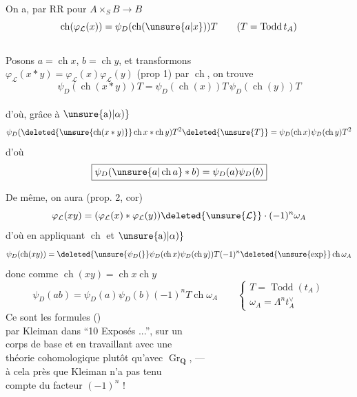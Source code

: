  On a, par RR pour $A\times_S B\longrightarrow B$
\[
\operatorname{ch}(\varphi_{\mathcal L}(x))=\psi_D(\operatorname{ch}(\unsure{a|x}))T
\qquad(T=\operatorname{Todd}t_A)
\]
\\
Posons $a=\operatorname{ch}x$, $b=\operatorname{ch}y$, et transformons\\
$\varphi_{\mathcal L}(x*y)=\varphi_{\mathcal L}(x)\varphi_{\mathcal L}(y)$ (prop 1) par $\operatorname{ch}$, on trouve
\[
\psi_D(\operatorname{ch}(x*y))T=\psi_D(\operatorname{ch}(x))T\,\psi_D(\operatorname{ch}(y))T
\]
\\
d'où, \deleted{$\unsure{\varphi}$} grâce à $\unsure{\text{a)}|\alpha)}$
\[
\psi_D(\deleted{\unsure{\operatorname{ch}(x*y)}}\operatorname{ch}x*\operatorname{ch}y)T^2\deleted{\unsure{T}}
=\psi_D(\operatorname{ch}x)\psi_D(\operatorname{ch}y)T^2
\]
d'où
\[
\boxed{\psi_D(\unsure{a|\operatorname{ch}a}*b)=\psi_D(a)\psi_D(b)}
\]

De même, on aura (prop. 2, cor)
\[
\varphi_{\mathcal L}(xy)=(\varphi_{\mathcal L}(x)*\varphi_{\mathcal L}(y))\deleted{\unsure{\mathcal L}}\cdot(-1)^n\omega_A
\]
d'où en appliquant $\operatorname{ch}$ et $\unsure{\text{a)}|\alpha)}$
\[
\psi_D(\operatorname{ch}(xy))=\deleted{\unsure{\psi_D(}}\psi_D(\operatorname{ch}x)\psi_D(\operatorname{ch}y))T(-1)^n\deleted{\unsure{\exp}}\operatorname{ch}\omega_A
\]
donc comme $\operatorname{ch}(xy)=\operatorname{ch}x\operatorname{ch}y$
\[
\boxed{\psi_D(ab)=\psi_D(a)\psi_D(b)(-1)^nT\operatorname{ch}\omega_A}
\qquad\begin{cases}T=\operatorname{Todd}(t_A)\\\omega_A=\Lambda^n t_A^\vee\end{cases}
\]
Ce sont les formules  ()\\
par Kleiman dans ``10 Exposés ...'', sur un\\
corps de base et en travaillant avec une\\
théorie cohomologique plutôt qu'avec $\operatorname{Gr}_{\mathbf Q}$, ---\\
à cela près que Kleiman n'a pas tenu\\
compte du facteur $(-1)^n$ !

